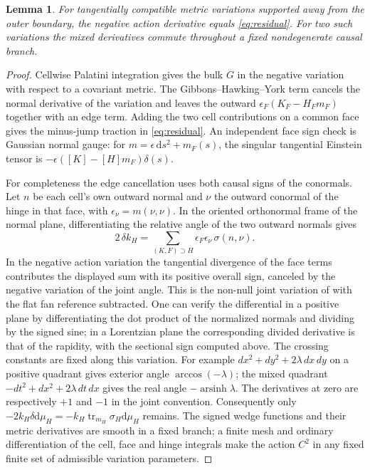 \documentclass[11pt]{article}
\newtheorem{lemma}[theorem]{Lemma}
\newcommand{\dd}{\mathrm d}
\newcommand{\tr}{\operatorname{tr}}
\begin{document}
\begin{lemma}\label{lem:variation}
For tangentially compatible metric variations supported away from the outer boundary, the negative action derivative equals \eqref{eq:residual}. For two such variations the mixed derivatives commute throughout a fixed nondegenerate causal branch.
\end{lemma}

\begin{proof}
Cellwise Palatini integration gives the bulk \(G\) in the negative variation with respect to a covariant metric. The Gibbons--Hawking--York term cancels the normal derivative of the variation and leaves the outward \(\epsilon_F(K_F-H_Fm_F)\) together with an edge term. Adding the two cell contributions on a common face gives the minus-jump traction in \eqref{eq:residual}. An independent face sign check is Gaussian normal gauge: for \(m=\epsilon\,\dd s^2+m_F(s)\), the singular tangential Einstein tensor is \(-\epsilon([K]-[H]m_F)\delta(s)\).

For completeness the edge cancellation uses both causal signs of the conormals. Let \(n\) be each cell's own outward normal and \(\nu\) the outward conormal of the hinge in that face, with \(\epsilon_\nu=m(\nu,\nu)\). In the oriented orthonormal frame of the normal plane, differentiating the relative angle of the two outward normals gives
\[
 2\,\delta k_H=\sum_{(K,F)\supset H}\epsilon_F\epsilon_\nu
                 \,\sigma(n,\nu).
\]
In the negative action variation the tangential divergence of the face terms contributes the displayed sum with its positive overall sign, canceled by the negative variation of the joint angle. This is the non-null joint variation of \cite{Hayward} with the flat fan reference subtracted. One can verify the differential in a positive plane by differentiating the dot product of the normalized normals and dividing by the signed sine; in a Lorentzian plane the corresponding divided derivative is that of the rapidity, with the sectional sign computed above. The crossing constants are fixed along this variation. For example \(dx^2+dy^2+2\lambda\,dx\,dy\) on a positive quadrant gives exterior angle \(\arccos(-\lambda)\); the mixed quadrant \(-dt^2+dx^2+2\lambda\,dt\,dx\) gives the real angle \(-\operatorname{arsinh}\lambda\). The derivatives at zero are respectively \(+1\) and \(-1\) in the joint convention. Consequently only \(-2 k_H\delta\dd\mu_H=-k_H\tr_{m_H}\sigma_H\dd\mu_H\) remains. The signed wedge functions and their metric derivatives are smooth in a fixed branch; a finite mesh and ordinary differentiation of the cell, face and hinge integrals make the action \(C^2\) in any fixed finite set of admissible variation parameters.
\end{proof}
\end{document}

